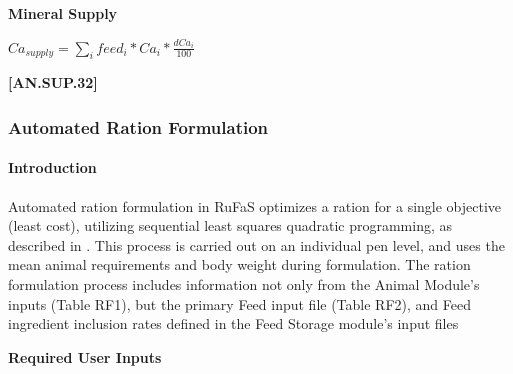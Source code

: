 \begin{refsection}
    \textbf{ Mineral Supply}
    \vspace{0.5cm}

    \begin{center}
    \(Ca_{supply} = \sum_{i} feed_{i} * Ca_{i} * \frac{dCa_{i}}{100}\)
    \end{center}
    \vspace{0.5cm}
    
            {\raggedleft \textbf{[AN.SUP.32]}\par}
            \vspace{0.5cm}



























    

\subsubsection{Automated Ration Formulation} 
\paragraph{Introduction}
Automated ration formulation in RuFaS optimizes a ration for a single objective (least cost), utilizing sequential least squares quadratic programming, as described in \cite{Li2022}. This process is carried out on an individual pen level, and uses the mean animal requirements and body weight during formulation. The ration formulation process includes information not only from the Animal Module’s inputs (Table RF1), but the primary Feed input file (Table RF2), and Feed ingredient inclusion rates defined in the Feed Storage module’s input files

\textbf{Required User Inputs} 



\begin{landscape}
\thispagestyle{empty}

\begin{table}[h!]
\caption{Key inputs found in the animal input file.}
\centering
\renewcommand{\arraystretch}{1.4}


\end{table}
\end{landscape}
\end{refsection}
